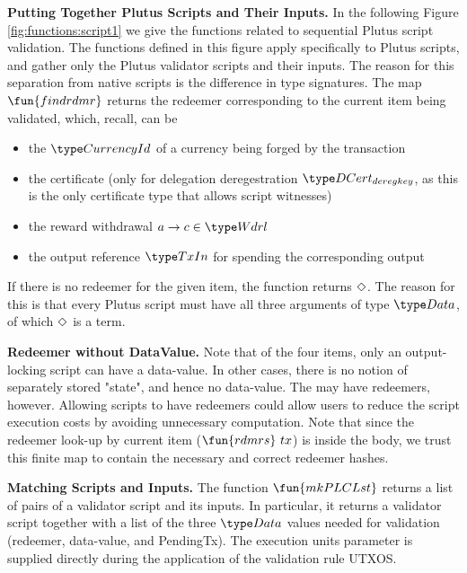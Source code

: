 \clearpage

\textbf{Putting Together Plutus Scripts and Their Inputs.}
In the following Figure \ref{fig:functions:script1} we give the functions
related to sequential Plutus script validation. The functions
defined in this figure apply specifically to Plutus scripts, and gather
only the Plutus validator scripts and their inputs. The reason for
this separation from native scripts is the difference in type signatures.
The map $\fun{findrdmr}$ returns the
redeemer corresponding to the current item being validated, which, recall, can
be

\begin{itemize}
  \item the $\CurrencyId$ of a currency being forged by the transaction
  \item the certificate (only for delegation deregestration $\DCertDeRegKey$,
  as this is the only certificate type that allows script witnesses)
  \item the reward withdrawal $a \to c \in \Wdrl$
  \item the output reference $\TxIn$ for spending the corresponding output
\end{itemize}

If there is no redeemer for the given item, the function returns $\Diamond$.
The reason for this is that every Plutus script must have all three arguments
of type $\Data$, of which $\Diamond$ is a term.

\textbf{Redeemer without DataValue.} Note that of the four items, only an
output-locking script can have a data-value. In other cases, there is no
notion of separately stored "state", and hence no data-value.
The may have redeemers, however.
Allowing scripts to have redeemers could allow users to reduce the script
execution costs by avoiding unnecessary computation. Note that since the
redeemer look-up by current item ($\fun{rdmrs}~{tx}$) is inside the body,
we trust this finite map to contain the necessary and correct redeemer hashes.

\textbf{Matching Scripts and Inputs.}
The function $\fun{mkPLCLst}$ returns a list of pairs of a validator script and
its inputs. In particular, it returns a validator script together with
 a list of the three $\Data$ values needed for validation (redeemer,
 data-value, and PendingTx). The execution units parameter is supplied
 directly during the application of the validation rule UTXOS.

